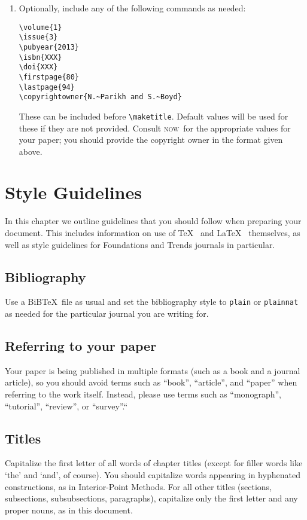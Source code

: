 \documentclass[openany]{now} %
\newcommand{\now}{\textsc{now}}
\begin{document}
\begin{enumerate}
\item Optionally, include any of the following commands as needed:

\begin{verbatim}
\volume{1}
\issue{3}
\pubyear{2013}
\isbn{XXX}
\doi{XXX}
\firstpage{80}
\lastpage{94}
\copyrightowner{N.~Parikh and S.~Boyd}
\end{verbatim}

These can be included before \texttt{\textbackslash maketitle}. Default values
will be used for these if they are not provided. Consult \now\ for the
appropriate values for your paper; you should provide the copyright owner in
the format given above.
\end{enumerate}

\chapter{Style Guidelines}

In this chapter we outline guidelines that you should follow when preparing
your document.  This includes information on use of \TeX\
\citep{KB:86} and \LaTeX\ \citep{Lam:94} themselves, as well as style guidelines
for Foundations and Trends\textsuperscript{\textregistered}  journals in particular.

\section{Bibliography}

Use a BiB\TeX\ file as usual and set the bibliography style to
\texttt{plain} or \texttt{plainnat} as needed for the particular
journal you are writing for.

\section{Referring to your paper}

Your paper is being published in multiple formats (such as a book and a journal
article), so you should avoid terms such as ``book'', ``article'', and ``paper''
when referring to the work itself. Instead, please use terms such as ``monograph'',
``tutorial'', ``review'', or ``survey''.`` 

\section{Titles}

Capitalize the first letter of all words of chapter titles 
(except for filler words like `the' and `and', of course). 
You should capitalize words appearing in hyphenated constructions, as in
Interior-Point Methods.
For all other titles (sections, subsections, subsubsections, paragraphs),
capitalize only the first letter and any proper nouns, as in this document.
\end{document}
